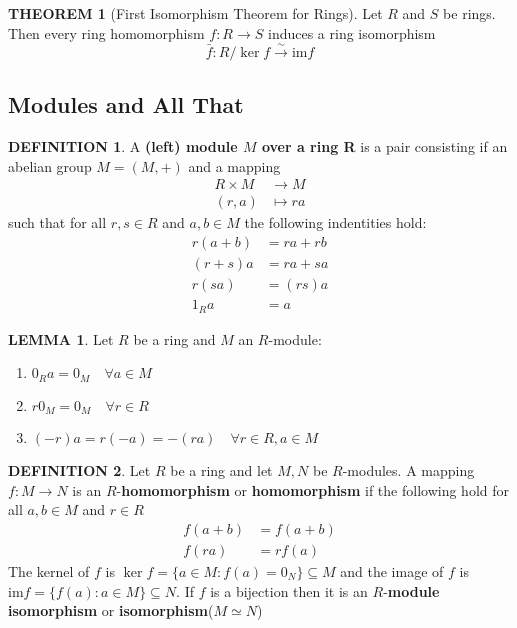 \documentclass[12pt]{article}
\theoremstyle{definition}
\newtheorem{definition}{DEFINITION}[subsection]
\newtheorem{theorem}{THEOREM}[subsection]
\newcommand{\image}{\text{im}}
\newtheorem{lemma}{LEMMA}[subsection]
\begin{document}
\begin{theorem}[First Isomorphism Theorem for Rings]
    Let $R$ and $S$ be rings. Then every ring homomorphism $f:R\rightarrow S$ induces a ring isomorphism
    $$\bar{f}:R/\ker f \stackrel{\sim}{\rightarrow} \text{im} f$$
\end{theorem}


\subsection{Modules and All That}
\begin{definition}
    A \textbf{(left) module $M$ over a ring R} is a pair consisting if an abelian group $M = (M, +)$ and a mapping
    \[\begin{split}
        R\times M &\rightarrow M\\
        (r,a) &\mapsto ra
    \end{split}\]
    such that for all $r,s \in R$ and $a,b \in M$ the following indentities hold:
    \[\begin{split}
        r(a+b) &= ra + rb\\
        (r+s)a &= ra + sa\\
        r(sa) &= (rs)a\\
        1_R a &= a
    \end{split}\]
\end{definition}

\begin{lemma}
    Let $R$ be a ring and $M$ an $R$-module:
    \begin{enumerate}
        \item $0_Ra = 0_M \quad \forall a \in M$
        \item $r0_M = 0_M \quad \forall r \in R$
        \item $(-r)a = r(-a) = -(ra) \quad \forall r\in R, a \in M$
    \end{enumerate}
\end{lemma}

\begin{definition}
    Let $R$ be a ring and let $M,N$ be $R$-modules. A mapping $f:M \rightarrow N$ is an $R$-\textbf{homomorphism} or \textbf{homomorphism} if the following hold for all $a,b \in M$ and $r \in R$
    \[\begin{split}
        f(a+b) &= f(a+b)\\
        f(ra) &= rf(a)
    \end{split}\]
    The kernel of $f$ is $\ker f  =\{a\in M:f(a)=0_N\} \subseteq M$ and the image of $f$ is $\image f = \{f(a):a\in M\}\subseteq N$. If $f$ is a bijection then it is an $R$-\textbf{module isomorphism} or \textbf{isomorphism}($M \simeq N$)
\end{definition}
\end{document}
